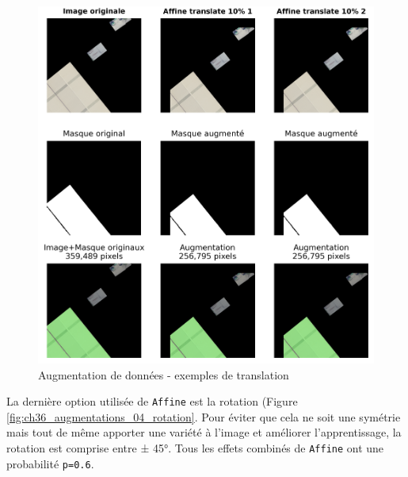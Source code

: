\begin{figure}[H]
    \centering
    \includegraphics[width=1\linewidth]{02-main/figures/ch3/ch36_augmentations_03_translation.png}
    \caption{Augmentation de données - exemples de translation}
    \label{fig:ch36_augmentations_03_translation}
\end{figure}

\newpage
La dernière option utilisée de \texttt{Affine} est la rotation (Figure \ref{fig:ch36_augmentations_04_rotation}. Pour éviter que cela ne soit une symétrie mais tout de même apporter une variété à l'image et améliorer l'apprentissage, la rotation est comprise entre ± 45°.
Tous les effets combinés de \texttt{Affine} ont une probabilité \texttt{p=0.6}.

